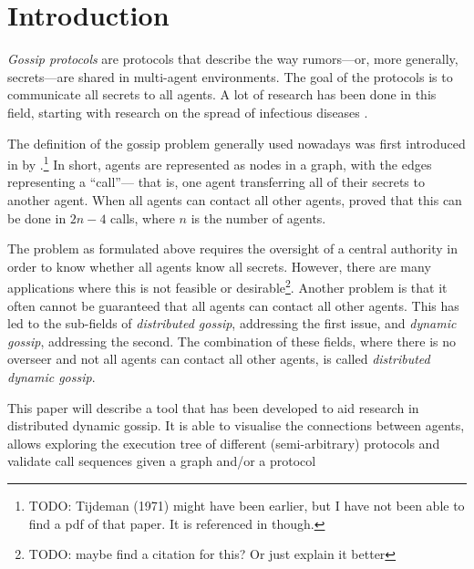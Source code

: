 
\section{Introduction}\label{sec:introduction}

\textit{Gossip protocols} are protocols that describe the way rumors---or, more generally, secrets---are shared in multi-agent environments.
The goal of the protocols is to communicate all secrets to all agents.
A lot of research has been done in this field, 
starting with research on the spread of infectious diseases \parencite{kermack_contribution_1927}.

The definition of the gossip problem generally used nowadays was first introduced in \citeyear{hajnal_cure_1972} by \citeauthor{hajnal_cure_1972}.\footnote{TODO: Tijdeman (1971) might have been earlier, but I have not been able to find a pdf of that paper. It is referenced in \Textcite{van_ditmarsch_dynamic_2018} though.}
In short, agents are represented as nodes in a graph, with the edges representing a ``call''---%
that is, one agent transferring all of their secrets to another agent.
When all agents can contact all other agents, \citeauthor{hajnal_cure_1972} proved that this can be done in \(2n-4\) calls, where \(n\) is the number of agents.

The problem as formulated above requires the oversight of a central authority in order to know whether all agents know all secrets.
However, there are many applications where this is not feasible or desirable\footnote{TODO: maybe find a citation for this? Or just explain it better}.
Another problem is that it often cannot be guaranteed that all agents can contact all other agents.
This has led to the sub-fields of \textit{distributed gossip}, addressing the first issue, and \textit{dynamic gossip}, addressing the second.
The combination of these fields, where there is no overseer and not all agents can contact all other agents, is called \textit{distributed dynamic gossip}.


This paper will describe a tool that has been developed to aid research in distributed dynamic gossip.
It is able to visualise the connections between agents, allows exploring the execution tree of different (semi-arbitrary) protocols and validate call sequences given a graph and/or a protocol

